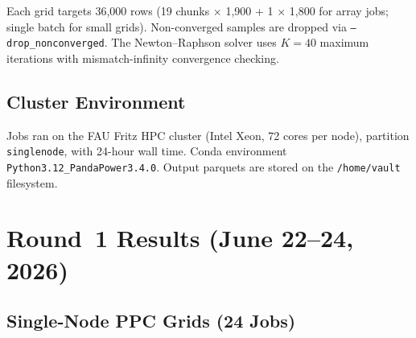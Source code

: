 \documentclass{article}
\begin{document}
Each grid targets 36{,}000 rows (19 chunks $\times$ 1{,}900 + 1 $\times$ 1{,}800
for array jobs; single batch for small grids).  Non-converged samples are
dropped via \texttt{--drop\_nonconverged}.  The Newton--Raphson solver uses
$K{=}40$ maximum iterations with mismatch-infinity convergence checking.

\subsection{Cluster Environment}

Jobs ran on the FAU Fritz HPC cluster (Intel Xeon, 72 cores per node),
partition \texttt{singlenode}, with 24-hour wall time.  Conda environment
\texttt{Python3.12\_PandaPower3.4.0}. Output parquets are stored on
the \texttt{/home/vault} filesystem.


\section{Round~1 Results (June 22--24, 2026)}
\label{sec:round1}

\subsection{Single-Node PPC Grids (24 Jobs)}
\end{document}
